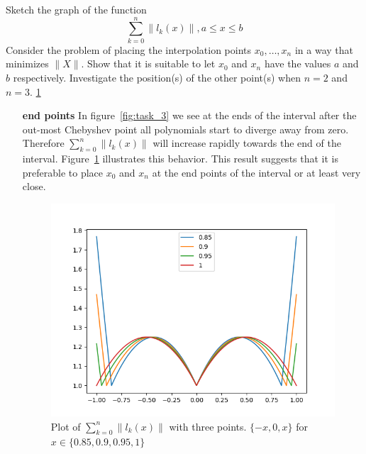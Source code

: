 \newpage

\begin{problem}
  Sketch the graph of the function
  \begin{equation*}
    \sum_{k=0}^n\|l_k(x)\|, a \leq x \leq b
  \end{equation*}
  Consider the problem of placing the interpolation points ${x_0,
    \dots, x_n }$ in a way that minimizes $\|X\|$. Show that it is
  suitable to let $x_0$ and $x_n$ have the values $a$ and $b$
  respectively. Investigate the position(s) of the other point(s) when
  $n = 2$ and $n = 3$. \ref{fig:task_4_edge}
\end{problem}


\begin{solution}
  \begin{enumerate}
    \item[{\bf end points}]In figure~\ref{fig:task_3} we see at the ends of
      the interval after the out-most Chebyshev point all polynomials
      start to diverge away from zero. Therefore
      $\sum_{k=0}^n\|l_k(x)\|$ will increase rapidly towards the end
      of the interval. Figure~\ref{fig:task_4_edge} illustrates this
      behavior. This result suggests that it is preferable to place
      $x_0$ and $x_n$ at the end points of the interval or at least
      very close.

\begin{figure}[!ht]
  \centering
  \includegraphics[scale = 0.5]{code/task_4_edge.png}
  \caption{Plot of $\sum_{k=0}^n\|l_k(x)\|$ with three points. $\{-x,
      0, x\}$ for $x \in \{0.85, 0.9, 0.95, 1\}$}
  \label{fig:task_4_edge}
\end{figure}


\end{enumerate}
\end{solution}
